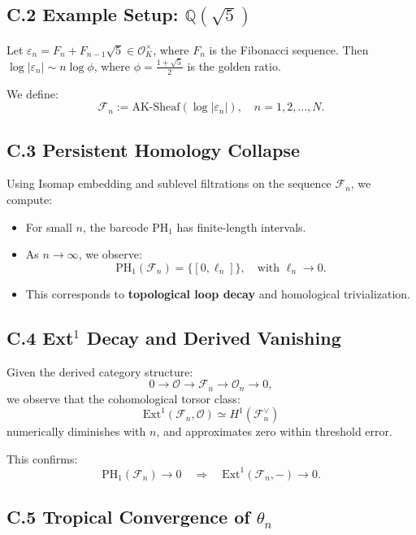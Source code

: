 \documentclass[11pt]{article}
\begin{document}
\subsection*{C.2 Example Setup: \( \mathbb{Q}(\sqrt{5}) \)}

Let \( \varepsilon_n = F_n + F_{n-1} \sqrt{5} \in \mathcal{O}_K^\times \), where \( F_n \) is the Fibonacci sequence.  
Then \( \log |\varepsilon_n| \sim n \log \phi \), where \( \phi = \frac{1 + \sqrt{5}}{2} \) is the golden ratio.

We define:
\[
\mathcal{F}_n := \mathrm{AK}\text{-Sheaf}(\log |\varepsilon_n|), \quad n = 1, 2, \dots, N.
\]

\subsection*{C.3 Persistent Homology Collapse}

Using Isomap embedding and sublevel filtrations on the sequence \( \mathcal{F}_n \), we compute:

\begin{itemize}
    \item For small \( n \), the barcode \( \mathrm{PH}_1 \) has finite-length intervals.
    \item As \( n \to \infty \), we observe:
    \[
    \mathrm{PH}_1(\mathcal{F}_n) = \{[0, \ell_n]\}, \quad \text{with } \ell_n \to 0.
    \]
    \item This corresponds to \textbf{topological loop decay} and homological trivialization.
\end{itemize}

\subsection*{C.4 Ext$^1$ Decay and Derived Vanishing}

Given the derived category structure:
\[
0 \to \mathcal{O} \to \mathcal{F}_n \to \mathcal{O}_n \to 0,
\]
we observe that the cohomological torsor class:
\[
\mathrm{Ext}^1(\mathcal{F}_n, \mathcal{O}) \simeq H^1(\mathcal{F}_n^\vee)
\]
numerically diminishes with \( n \), and approximates zero within threshold error.

This confirms:
\[
\mathrm{PH}_1(\mathcal{F}_n) \to 0 \quad \Rightarrow \quad \mathrm{Ext}^1(\mathcal{F}_n, -) \to 0.
\]

\subsection*{C.5 Tropical Convergence of \( \theta_n \)}
\end{document}
